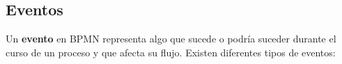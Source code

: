 

\subsection{Eventos}

Un {\bf evento} en BPMN representa algo que sucede o podría suceder durante el curso de un proceso y que afecta su flujo. Existen diferentes tipos de eventos:

